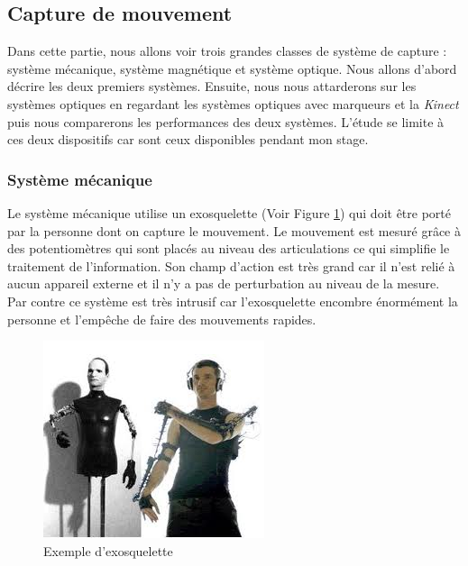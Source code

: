 \subsection{Capture de mouvement}
Dans cette partie, nous allons voir trois grandes classes de système de capture : système mécanique, système magnétique et système optique\cite{kn07}\cite{zo12}. Nous allons d'abord décrire les deux premiers systèmes. Ensuite, nous nous attarderons sur les systèmes optiques en regardant les systèmes optiques avec marqueurs et la \emph{Kinect} puis nous comparerons les performances des deux systèmes. L'étude se limite à ces deux dispositifs car sont ceux disponibles pendant mon stage.
\subsubsection{Système mécanique}
 Le système mécanique utilise un exosquelette (Voir Figure \ref{fig7}) qui doit être porté par la personne dont on capture le mouvement. Le mouvement est mesuré grâce à des potentiomètres qui sont placés au niveau des articulations ce qui simplifie le traitement de l'information. Son champ d'action est très grand car il n'est relié à aucun appareil externe et il n'y a pas de perturbation au niveau de la mesure. Par contre ce système est très intrusif car l'exosquelette encombre énormément la personne et l'empêche de faire des mouvements rapides.
 \begin{figure}[!h]
    	\centerline{\includegraphics[scale=0.8]{images/biblio/captureMecaTest}}
    	\caption{\label{fig7} Exemple d'exosquelette}
 \end{figure}
